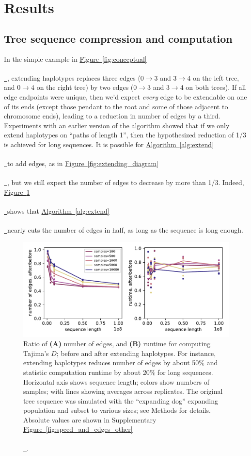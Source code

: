 \documentclass[10pt,twoside,lineno]{gsajnl}
\newcommand{\algorithmref}[2][]{%
	\hyperref[{#2}]{%
		Algorithm~\ref*{#2}%
		\ifx\\#1\\%
		\else
		\,#1%
		\fi
	}%
}
\newcommand*{\figref}[2][]{%
	\hyperref[{#2}]{%
		Figure~\ref*{#2}%
		\ifx\\#1\\%
		\else
		\,#1%
		\fi
	}%
}
\begin{document}
\section{Results}

\subsection{Tree sequence compression and computation}


In the simple example in \figref{fig:conceptual},
extending haplotypes replaces three edges
($0 \to 3$ and $3 \to 4$ on the left tree, and $0 \to 4$ on the right tree)
by two edges ($0 \to 3$ and $3 \to 4$ on both trees).
If all edge endpoints were unique, then we'd expect \emph{every} edge to be extendable
on one of its ends
(except those pendant to the root and some of those adjacent to chromosome ends),
leading to a reduction in number of edges by a third.
Experiments with an earlier version of the algorithm showed that
if we only extend haplotypes on ``paths of length 1'', 
then the hypothesized reduction of 1/3 is achieved for long sequences.
It is possible for \algorithmref{alg:extend} to add edges, as in \figref{fig:extending_diagram},
but we still expect the number of edges to decrease by more than 1/3.
Indeed,
\figref{fig:speed_and_edges} shows that \algorithmref{alg:extend} nearly cuts the number of edges
in half, as long as the sequence is long enough.

\begin{figure}
    \centering
    \includegraphics{benchmarks/one_pop_results_ratios}
    \caption{
        Ratio of
        \textbf{(A)} number of edges, and
        \textbf{(B)} runtime for computing Tajima's $D$;
        before and after extending haplotypes.
        For instance, extending haplotypes reduces number of edges by about 50\%
        and statistic computation runtime by about 20\%
        for long sequences.
        Horizontal axis shows sequence length;
        colors show numbers of samples;
        with lines showing averages across replicates.
        The original tree sequence was simulated with the ``expanding dog'' expanding population
        and subset to various sizes;
        see Methods for details. 
        Absolute values are shown in Supplementary \figref{fig:speed_and_edges_other}.
        \label{fig:speed_and_edges}
    }
\end{figure}
\end{document}
